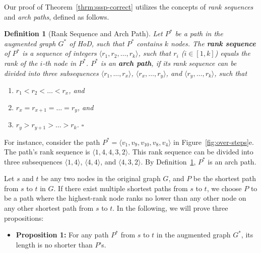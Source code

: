 \documentclass{sig-alternate}
\newtheorem{definition} {Definition}
\def\done{\hspace*{\fill} {$\square$}}
\def\G{G^*}
\def\P{P^*}
\begin{document}
\begin{sloppy}
%


Our proof of Theorem~\ref{thrm:sssp-correct} utilizes the concepts of {\em rank sequences} and {\em arch paths}, defined as follows.
\begin{definition}[Rank Sequence and Arch Path] \label{def:proof-rank}
Let $\P$ be a path in the augmented graph $\G$ of HoD, such that $\P$ contains $k$ nodes. The {\bf rank sequence} of $\P$ is a sequence of integers $\langle r_1, r_2, \ldots, r_k\rangle$, such that $r_i$ ($i \in [1, k]$) equals the rank of the $i$-th node in $\P$. $\P$ is an {\bf arch path}, if its rank sequence can be divided into three subsequences $\langle r_1, \ldots, r_x\rangle$, $\langle r_x, \ldots, r_y\rangle$, and $\langle r_y, \ldots, r_k\rangle$, such that
\begin{enumerate} [itemsep = 0.5mm, topsep = 2mm]
\item $r_1 < r_2 < \ldots < r_x$, and

\item $r_x = r_{x+1} = \ldots = r_y$, and

\item $r_y > r_{y+1} > \ldots > r_k$. \done
\end{enumerate}
\end{definition}
For instance, consider the path $\P = \langle v_1, v_9, v_{10}, v_8, v_4\rangle$ in Figure~\ref{fig:over-steps}e. The path's rank sequence is $\langle 1, 4, 4, 3, 2\rangle$. This rank sequence can be divided into three subsequences $\langle 1, 4\rangle$, $\langle 4, 4\rangle$, and $\langle 4, 3, 2\rangle$. By Definition~\ref{def:proof-rank}, $\P$ is an arch path.

Let $s$ and $t$ be any two nodes in the original graph $G$, and $P$ be the shortest path from $s$ to $t$ in $G$. If there exist multiple shortest paths from $s$ to $t$, we choose $P$ to be a path where the highest-rank node ranks no lower than any other node on any other shortest path from $s$ to $t$. In the following, we will prove three propositions:
\begin{itemize}
\item {\bf Proposition 1:} For any path $\P$ from $s$ to $t$ in the augmented graph $\G$, its length is no shorter than $P$'s.


\end{itemize}
\end{sloppy}
\end{document}
